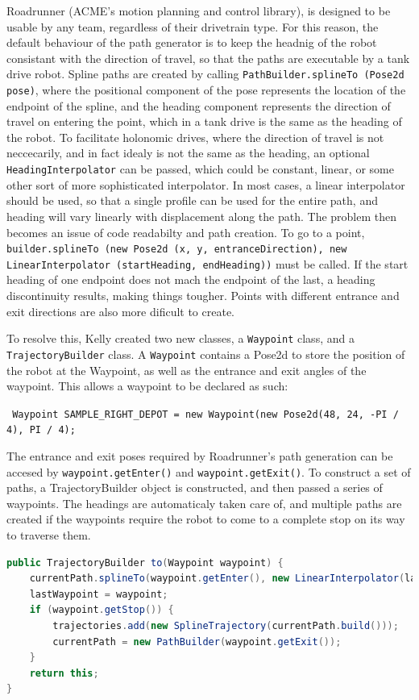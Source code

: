 \documentclass{article}
\begin{document}
Roadrunner (ACME's motion planning and control library), is designed to be usable by any team, regardless of their drivetrain type. For this reason, the default behaviour of the path generator is to keep the headnig of the robot consistant with the direction of travel, so that the paths are executable by a tank drive robot. Spline paths are created by calling \texttt{PathBuilder.splineTo (Pose2d pose)}, where the positional component of the pose represents the location of the endpoint of the spline, and the heading component represents the direction of travel on entering the point, which in a tank drive is the same as the heading of the robot. To facilitate holonomic drives, where the direction of travel is not neccecarily, and in fact idealy is not the same as the heading, an optional \texttt{HeadingInterpolator} can be passed, which could be constant, linear, or some other sort of more sophisticated interpolator. In most cases, a linear interpolator should be used, so that a single profile can be used for the entire path, and heading will vary linearly with displacement along the path. The problem then becomes an issue of code readabilty and path creation. To go to a point, \texttt{builder.splineTo (new Pose2d (x, y, entranceDirection), new LinearInterpolator (startHeading, endHeading))} must be called. If the start heading of one endpoint does not mach the endpoint of the last, a heading discontinuity results, making things tougher. Points with different entrance and exit directions are also more dificult to create.

To resolve this, Kelly created two new classes, a \texttt{Waypoint} class, and a \texttt{TrajectoryBuilder} class. A \texttt{Waypoint} contains a Pose2d to store the position of the robot at the Waypoint, as well as the entrance and exit angles of the waypoint. This allows a waypoint to be declared as such:

 \lstinline{ Waypoint SAMPLE_RIGHT_DEPOT = new Waypoint(new Pose2d(48, 24, -PI / 4), PI / 4); }

The entrance and exit poses required by Roadrunner's path generation can be accesed by \texttt{waypoint.getEnter()} and \texttt{waypoint.getExit()}. To construct a set of paths, a TrajectoryBuilder object is constructed, and then passed a series of waypoints. The headings are automaticaly taken care of, and multiple paths are created if the waypoints require the robot to come to a complete stop on its way to traverse them. 

\begin{lstlisting}[language=Java]
public TrajectoryBuilder to(Waypoint waypoint) {
	currentPath.splineTo(waypoint.getEnter(), new LinearInterpolator(lastWaypoint.getHeading(), waypoint.getHeading()));
	lastWaypoint = waypoint;
	if (waypoint.getStop()) {
		trajectories.add(new SplineTrajectory(currentPath.build()));
		currentPath = new PathBuilder(waypoint.getExit());
	}
	return this;
}
\end{lstlisting}
\end{document}
